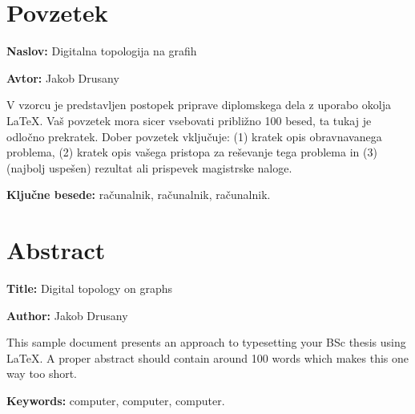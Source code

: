 \documentclass[a4paper, 12pt]{book}
\newcommand{\ttitle}{Digitalna topologija na grafih}
\newcommand{\ttitleEn}{Digital topology on graphs}
\newcommand{\tauthor}{Jakob Drusany}
\newcommand{\tkeywords}{računalnik, računalnik, računalnik}
\newcommand{\tkeywordsEn}{computer, computer, computer}
\newcommand{\clearemptydoublepage}{\newpage{\pagestyle{empty}\cleardoublepage}}
\begin{document}
\chapter*{Povzetek}

\noindent\textbf{Naslov:} \ttitle
\bigskip

\noindent\textbf{Avtor:} \tauthor
\bigskip

\noindent V vzorcu je predstavljen postopek priprave diplomskega dela z uporabo okolja \LaTeX. Vaš povzetek mora sicer vsebovati približno 100 besed, ta tukaj je odločno prekratek.
Dober povzetek vključuje: (1) kratek opis obravnavanega problema, (2) kratek opis vašega pristopa za reševanje tega problema in (3) (najbolj uspešen) rezultat ali prispevek magistrske naloge.

\bigskip

\noindent\textbf{Ključne besede:} \tkeywords.
\clearemptydoublepage

\chapter*{Abstract}

\noindent\textbf{Title:} \ttitleEn
\bigskip

\noindent\textbf{Author:} \tauthor
\bigskip

\noindent This sample document presents an approach to typesetting your BSc thesis using \LaTeX. 
A proper abstract should contain around 100 words which makes this one way too short.
\bigskip

\noindent\textbf{Keywords:} \tkeywordsEn.
\clearemptydoublepage

\mainmatter
\setcounter{page}{1}
\pagestyle{fancy}
\end{document}
